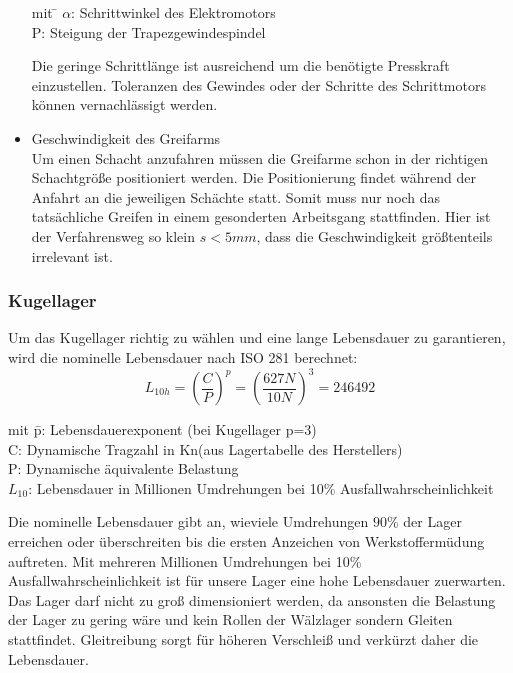 \begin{itemize}
\begin{tabbing}
mit \= $\alpha$: Schrittwinkel des Elektromotors\\
    \> P: Steigung der Trapezgewindespindel
\end{tabbing}

Die geringe Schrittlänge ist ausreichend um die benötigte Presskraft einzustellen. Toleranzen des Gewindes oder der Schritte des Schrittmotors können vernachlässigt werden.
\newline

 
\item Geschwindigkeit des Greifarms\\

Um einen Schacht anzufahren müssen die Greifarme schon in der richtigen Schachtgröße positioniert werden. 
Die Positionierung findet während der Anfahrt an die jeweiligen Schächte statt. Somit muss nur noch das tatsächliche Greifen in einem gesonderten Arbeitsgang stattfinden. Hier ist der Verfahrensweg so klein $s<5mm$, dass die Geschwindigkeit größtenteils irrelevant ist. 

\end{itemize}



\subsubsection{Kugellager}

Um das Kugellager richtig zu wählen und eine lange Lebensdauer zu garantieren, wird die nominelle Lebensdauer nach 
ISO 281 berechnet:\\

\[L_{10h}=(\frac{C}{P})^p=(\frac{627N}{10N})^3 = 246492\]	


\begin{tabbing}
mit \= p: Lebensdauerexponent (bei Kugellager p=3)\\
    \> C: Dynamische Tragzahl in Kn(aus Lagertabelle des Herstellers) \\
    \> P: Dynamische äquivalente Belastung\\
		\> $L_{10}$: Lebensdauer in Millionen Umdrehungen bei 10\% Ausfallwahrscheinlichkeit
\end{tabbing}


Die nominelle Lebensdauer gibt an, wieviele Umdrehungen $90\%$ der Lager erreichen oder überschreiten bis die ersten Anzeichen von Werkstoffermüdung auftreten. Mit mehreren Millionen Umdrehungen bei 10\% Ausfallwahrscheinlichkeit ist für unsere Lager eine hohe Lebensdauer zuerwarten. Das Lager darf nicht zu groß dimensioniert werden, da ansonsten die Belastung der Lager zu gering wäre und kein Rollen der Wälzlager sondern Gleiten stattfindet. Gleitreibung sorgt für höheren Verschleiß und verkürzt daher die Lebensdauer.\\

